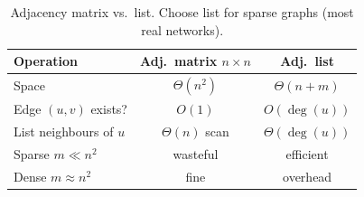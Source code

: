 \begin{table}[h]
\centering
\small
\begin{tabular}{lcc}
\toprule
Operation & Adj.\ matrix $n\times n$ & Adj.\ list \\
\midrule
Space & $\Theta(n^{2})$ & $\Theta(n+m)$ \\
Edge $(u,v)$ exists? & $O(1)$ & $O(\deg(u))$ \\
List neighbours of $u$ & $\Theta(n)$ scan & $\Theta(\deg(u))$ \\
Sparse $m\ll n^{2}$ & wasteful & efficient \\
Dense $m\approx n^{2}$ & fine & overhead \\
\bottomrule
\end{tabular}
\caption{Adjacency matrix vs.\ list. Choose list for sparse graphs (most real networks).}
\label{tab:graph-repr}
\end{table}

